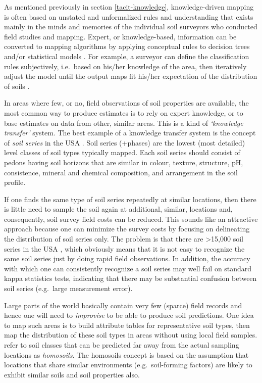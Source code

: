 \documentclass[graybox,natbib,nospthms,UStrade]{svmono}
\begin{document}
As mentioned previously in section \ref{tacit-knowledge}, knowledge-driven
mapping is often based on unstated and unformalized rules and
understanding that exists mainly in the minds and memories of the
individual soil surveyors who conducted field studies and mapping.
Expert, or knowledge-based, information can be converted to mapping
algorithms by applying conceptual rules to decision trees and/or
statistical models \citep{MacMillan2005CJSS, Walter2006DSS, Liu2009}.
For example, a surveyor can define the classification rules
subjectively, i.e.~based on his/her knowledge of the area, then
iteratively adjust the model until the output maps fit his/her
expectation of the distribution of soils \citep{MacMillan2010DSM}.

In areas where few, or no, field observations of soil properties are
available, the most common way to produce estimates is to rely on expert
knowledge, or to base estimates on data from other, similar areas. This
is a kind of \emph{`knowledge transfer'} system. The best example of a knowledge
transfer system is the concept of \emph{soil series} in the USA
\citep{Simonson1968AA}. Soil series (+phases) are the lowest (most detailed) level classes of
soil types typically mapped. Each soil series should consist of pedons
having soil horizons that are similar in colour, texture, structure, pH,
consistence, mineral and chemical composition, and arrangement in the
soil profile.

If one finds the same type of soil series repeatedly at similar
locations, then there is little need to sample the soil again at additional,
similar, locations and, consequently, soil survey field costs can be
reduced. This sounds like an attractive approach because one can
minimize the survey costs by focusing on delineating the distribution of
soil series only. The problem is that there are \textgreater{}15,000 soil series in the
USA \citep{Smith1986SMSS}, which obviously means that it is not easy to
recognize the same soil series just by doing rapid field observations.
In addition, the accuracy with which one can consistently recognize a soil series may
well fail on standard kappa statistics tests, indicating that there may
be substantial confusion between soil series (e.g.~large measurement
error).

Large parts of the world basically contain very few (sparce) field records and hence
one will need to \emph{improvise} to be able to produce soil predictions. One
idea to map such areas is to build attribute tables for representative
soil types, then map the distribution of these soil types in areas
without using local field samples. \citet{Mallavan2010PSS} refer to soil
classes that can be predicted far away from the actual sampling
locations as \emph{homosoils}. The homosoils concept is based on the
assumption that locations that share similar environments (e.g.~soil-forming factors) are
likely to exhibit similar soils and soil properties also.
\end{document}
